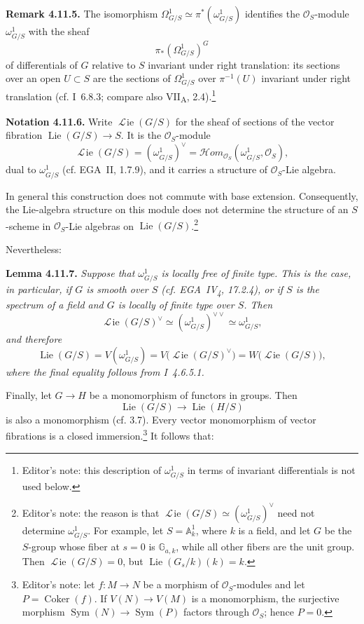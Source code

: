 \medskip
\noindent\textbf{Remark 4.11.5.}
The isomorphism
\(\Omega^1_{G/S}\simeq\pi^*(\omega^1_{G/S})\) identifies the
\(\mathcal O_S\)-module \(\omega^1_{G/S}\) with the sheaf
\[
 \pi_*(\Omega^1_{G/S})^G
\]
of differentials of \(G\) relative to \(S\) invariant under right
translation: its sections over an open \(U\subset S\) are the
sections of \(\Omega^1_{G/S}\) over \(\pi^{-1}(U)\) invariant under
right translation (cf. I~6.8.3; compare also
VII\textsubscript{A}, 2.4).\footnote{Editor's note: this description of
\(\omega^1_{G/S}\) in terms of invariant differentials is not used
below.}

\medskip
\noindent\textbf{Notation 4.11.6.}
Write \(\mathop{\mathscr L\!ie}(G/S)\) for the sheaf of sections of the vector
fibration \(\operatorname{Lie}(G/S)\to S\). It is the
\(\mathcal O_S\)-module
\[
 \mathop{\mathscr L\!ie}(G/S)
 =(\omega^1_{G/S})^\vee
 =\mathcal Hom_{\mathcal O_S}(\omega^1_{G/S},\mathcal O_S),
\]
dual to \(\omega^1_{G/S}\) (cf. EGA~II, 1.7.9), and it carries a
structure of \(\mathcal O_S\)-Lie algebra.

In general this construction does not commute with base extension.
Consequently, the Lie-algebra structure on this module does not
determine the structure of an \(S\)-scheme in
\(\mathcal O_S\)-Lie algebras on
\(\operatorname{Lie}(G/S)\).\footnote{Editor's note: the reason is
that \(\mathop{\mathscr L\!ie}(G/S)\simeq(\omega^1_{G/S})^\vee\) need not
determine \(\omega^1_{G/S}\). For example, let
\(S=\mathbb A^1_k\), where \(k\) is a field, and let \(G\) be the
\(S\)-group whose fiber at \(s=0\) is \(\mathbb G_{a,k}\), while all
other fibers are the unit group. Then
\(\mathop{\mathscr L\!ie}(G/S)=0\), but
\(\operatorname{Lie}(G_s/k)(k)=k\).}

Nevertheless:

\medskip
\noindent\textbf{Lemma 4.11.7.}
\textit{Suppose that \(\omega^1_{G/S}\) is locally free of finite type.
This is the case, in particular, if \(G\) is smooth over \(S\)
(cf. EGA~IV\textsubscript{4}, 17.2.4), or if \(S\) is the spectrum
of a field and \(G\) is locally of finite type over \(S\). Then}
\[
 \mathop{\mathscr L\!ie}(G/S)^\vee
 \simeq(\omega^1_{G/S})^{\vee\vee}
 \simeq\omega^1_{G/S},
\]
\textit{and therefore}
\[
 \operatorname{Lie}(G/S)
 =V(\omega^1_{G/S})
 =V\bigl(\mathop{\mathscr L\!ie}(G/S)^\vee\bigr)
 =W\bigl(\mathop{\mathscr L\!ie}(G/S)\bigr),
\]
\textit{where the final equality follows from I~4.6.5.1.}

Finally, let \(G\to H\) be a monomorphism of functors in groups.
Then
\[
 \operatorname{Lie}(G/S)\longrightarrow\operatorname{Lie}(H/S)
\]
is also a monomorphism (cf. 3.7). Every vector monomorphism of vector
fibrations is a closed immersion.\footnote{Editor's note: let
\(f:M\to N\) be a morphism of \(\mathcal O_S\)-modules and let
\(P=\operatorname{Coker}(f)\). If \(V(N)\to V(M)\) is a monomorphism,
the surjective morphism
\(\operatorname{Sym}(N)\to\operatorname{Sym}(P)\) factors through
\(\mathcal O_S\); hence \(P=0\).}
It follows that:

